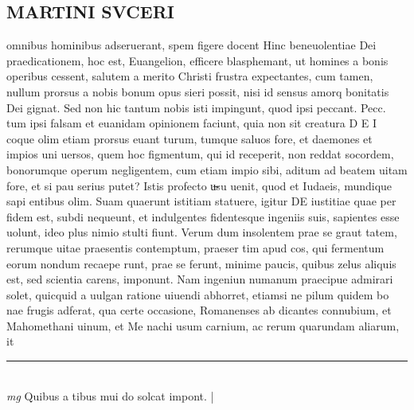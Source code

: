 \documentclass{article}
\begin{document}
\begin{pages}
\section*{MARTINI SVCERI }\pstart omnibus hominibus adseruerant, spem figere docent Hinc beneuolentiae Dei praedicationem, hoc est, Euangelion, efficere blasphemant, ut homines a bonis operibus cessent, salutem a merito Christi frustra expectantes, cum tamen, nullum prorsus a nobis bonum opus sieri possit, nisi id sensus amorq bonitatis Dei gignat. Sed non hic tantum nobis isti impingunt, quod ipsi peccant.  Pecc. tum ipsi falsam et euanidam opinionem faciunt, quia non sit creatura D E I coque olim etiam prorsus euant turum, tumque saluos fore, et daemones et impios uni uersos, quem hoc figmentum, qui id receperit, non reddat socordem, bonorumque operum negligentem, cum etiam impio sibi, aditum ad beatem uitam fore, et si pau serius putet?  \pend\pstart Istis profecto u̶su uenit, quod et Iudaeis, mundique sapi entibus olim. Suam quaerunt istitiam statuere, igitur DE iustitiae quae per fidem est, subdi nequeunt, et indulgentes fidentesque ingeniis suis, sapientes esse uolunt, ideo plus nimio stulti fiunt. Verum dum insolentem prae se graut tatem, rerumque uitae praesentis contemptum, praeser tim apud cos, qui fermentum eorum nondum recaepe runt, prae se ferunt, minime paucis, quibus zelus aliquis est, sed scientia carens, imponunt. Nam ingeniun numanum praecipue admirari solet, quicquid a uulgan ratione uiuendi abhorret, etiamsi ne pilum quidem bo nae frugis adferat, qua certe occasione, Romanenses ab dicantes connubium, et Mahomethani uinum, et Me nachi usum carnium, ac rerum quarundam aliarum, it  \pend
\vspace{0.5cm}\noindent
\vspace{0.2cm}\rule{1cm}{0.2pt}\\ 
\hspace{0.2cm}\textit{mg}
\footnotesize Quibus   a tibus mui do solcat impont.  
\normalsize| 

\end{pages}
\end{document}
